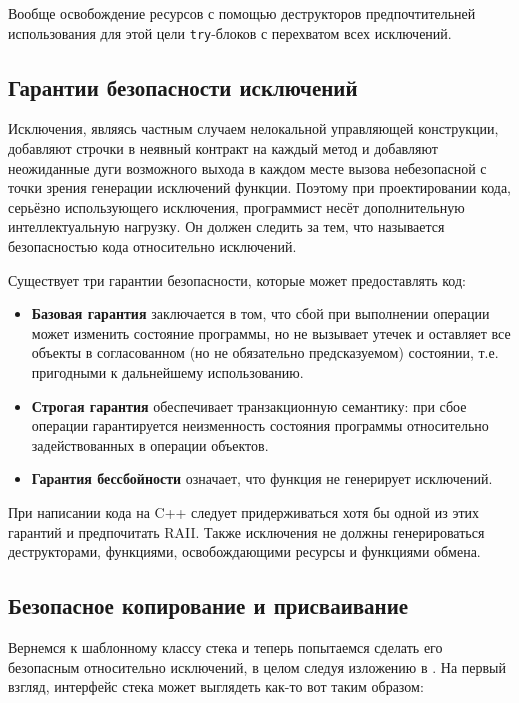 \documentclass[a4paper,12pt,oneside]{article}
\begin{document}
Вообще освобождение ресурсов с помощью деструкторов предпочтительней использования для этой цели \lstinline!try!-блоков с перехватом всех исключений.

\subsection{Гарантии безопасности исключений}

Исключения, являясь частным случаем нелокальной управляющей конструкции, добавляют строчки в неявный контракт на каждый метод и добавляют неожиданные дуги возможного выхода в каждом месте вызова небезопасной с точки зрения генерации исключений функции. Поэтому при проектировании кода, серьёзно использующего исключения, программист несёт дополнительную интеллектуальную нагрузку. Он должен следить за тем, что называется безопасностью кода относительно исключений.

Существует три гарантии безопасности, которые может предоставлять код:

\begin{itemize}
\item
\textbf{Базовая гарантия} заключается в том, что сбой при выполнении операции может изменить состояние программы, но не вызывает утечек и оставляет все объекты в согласованном (но не обязательно предсказуемом) состоянии, т.е. пригодными к дальнейшему использованию.
\item
\textbf{Строгая гарантия} обеспечивает транзакционную семантику: при сбое операции гарантируется неизменность состояния программы относительно задействованных в операции объектов.
\item
\textbf{Гарантия бессбойности} означает, что функция не генерирует исключений.
\end{itemize}

При написании кода на C++ следует придерживаться хотя бы одной из этих гарантий и предпочитать RAII. Также исключения не должны генерироваться деструкторами, функциями, освобождающими ресурсы и функциями обмена.

\subsection{Безопасное копирование и присваивание}

Вернемся к шаблонному классу стека и теперь попытаемся сделать его безопасным относительно исключений, в целом следуя изложению в \cite{exceptionalcpp}. На первый взгляд, интерфейс стека может выглядеть как-то вот таким образом:
\end{document}
